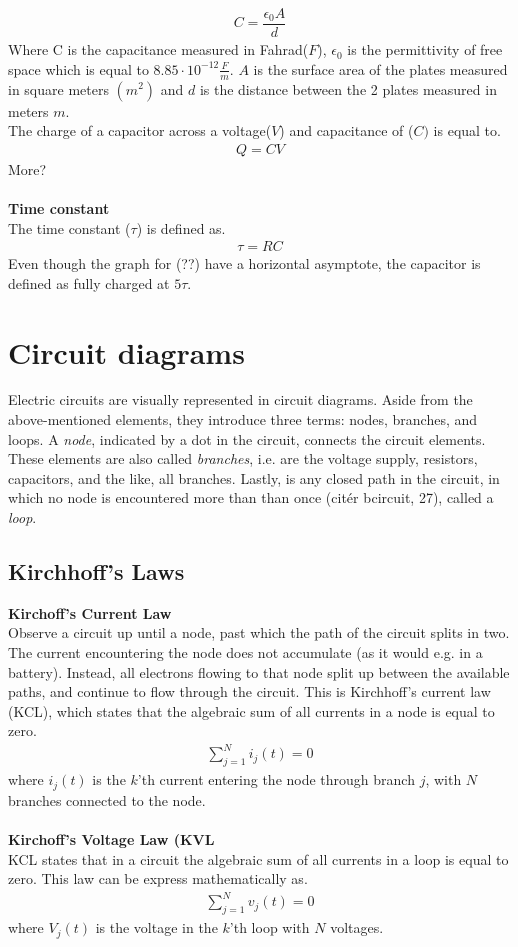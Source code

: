 \begin{align}
C=\dfrac{\epsilon_{0}A}{d}
\end{align}
Where C is the capacitance measured in Fahrad($F$), $\epsilon_{0}$ is the permittivity of free space which is equal to $8.85 \cdot 10^{-12}                                                 \frac{F}{m}$. $A$ is the surface area of the plates measured in square meters $(m^{2})$ and $d$ is the distance between the 2 plates measured in meters $m$.
\\
The charge of a capacitor across a voltage($V$) and capacitance of ($C)$ is equal to.
\begin{align}
Q=CV	
\end{align}
More?
\\
\\
\textbf{Time constant}
\\
The time constant ($\tau$) is defined as.
\begin{align}
\tau = RC
\end{align}
Even though the graph for (??) have a horizontal asymptote, the capacitor is defined as fully charged at $5\tau$.

\section{Circuit diagrams}
Electric circuits are visually represented in circuit diagrams. Aside from the above-mentioned elements, they introduce three terms: nodes, branches, and loops. A \textit{node}, indicated by a dot in the circuit, connects the circuit elements. These elements are also called \textit{branches}, i.e. are the voltage supply, resistors, capacitors, and the like, all branches. Lastly, is any closed path in the circuit, in which no node is encountered more than than once (citér bcircuit, 27), called a \textit{loop}.
\subsection{Kirchhoff's Laws}
\textbf{Kirchoff's Current Law}
\\
Observe a circuit up until a node, past which the path of the circuit splits in two. The current encountering the node does not accumulate (as it would e.g. in a battery). Instead, all electrons flowing to that node split up between the available paths, and continue to flow through the circuit. This is Kirchhoff’s current law (KCL), which states that the algebraic sum of all currents in a node is equal to zero. 
\begin{align}
\sum_{j=1}^{N} i_{j}(t) = 0
\end{align}
where $i_{j}(t)$ is the $k$'th current entering the node through branch $j$, with $N$ branches connected to the node.\cite[page~32]{bcircuit}
\\
\\
\textbf{Kirchoff's Voltage Law (KVL}
\\
KCL states that in a circuit the algebraic sum of all currents in a loop is equal to zero. This law can be express mathematically  as.
\begin{align}
\sum_{j=1}^{N} v_{j}(t) = 0
\end{align}
where $V_{j}(t)$ is the voltage in the $k$'th loop with $N$ voltages.\citep[page~34]{bcircuit}
